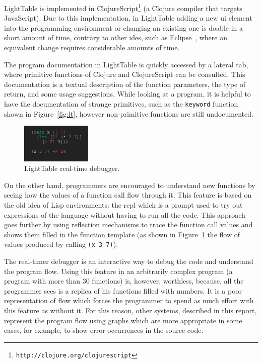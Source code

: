 LightTable is implemented in ClojureScript\footnote{\texttt{http://clojure.org/clojurescript}} (a Clojure compiler that targets JavaScript). Due to this implementation, in LightTable adding a new \ac{ui} element into the programming environment or changing an existing one is doable in a short amount of time, contrary to other \ac{ide}s, such as Eclipse~\cite{carlson2005eclipse}, where an equivalent change requires considerable amounts of time. 

The program documentation in LightTable is quickly accessed by a lateral tab, where primitive functions of Clojure and ClojureScript can be consulted. This documentation is a textual description of the function parameters, the type of return, and some usage suggestions. While looking at a program, it is helpful to have the documentation of strange primitives, such as the \texttt{keyword} function shown in Figure~\ref{fig:lt}, however non-primitive functions are still undocumented. 

\begin{figure}
  \vspace{-30pt}
  \begin{center}
    \includegraphics[width=0.3\textwidth]{img/eval-close}
  \end{center}
  \vspace{-15pt}
 \caption{LightTable real-time debugger.}  
  \vspace{-20pt}
    \label{fig:lt2}
\end{figure}

On the other hand, programmers are encouraged to understand new functions by seeing how the values of a function call flow through it. This feature is based on the old idea of Lisp environments: the \ac{repl} which is a prompt used to try out expressions of the language without having to run all the code. This approach goes further by using reflection mechanisms to trace the function call values and shows them filled in the function template (as shown in Figure~\ref{fig:lt2} the flow of values produced by calling \texttt{(x 3 7)}).

The real-timer debugger is an interactive way to debug the code and understand the program flow. Using this feature in an arbitrarily complex program (a program with more than 30 functions) is, however, worthless, because, all the programmer sees is a replica of his functions filled with numbers. It is a poor representation of flow which forces the programmer to spend as much effort with this feature as without it. For this reason, other systems, described in this report, represent the program flow using graphs which are more appropriate in some cases, for example, to show error occurrences in the source code.


